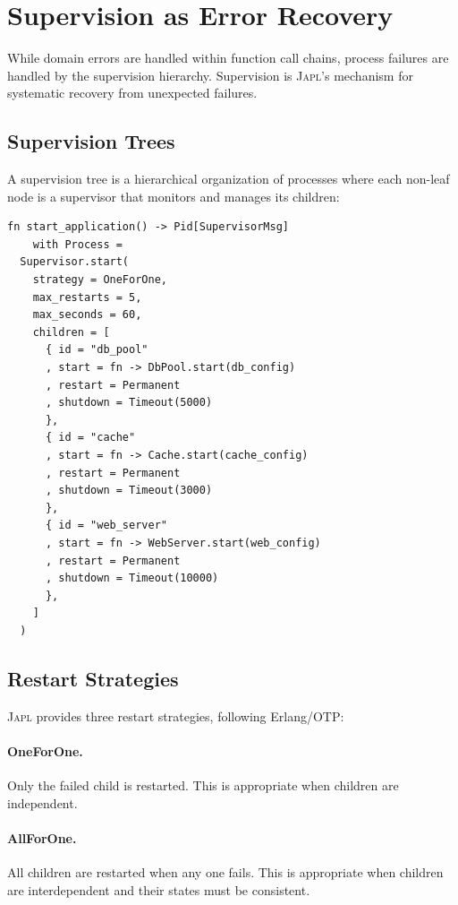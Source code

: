 \documentclass[11pt,twocolumn]{article}
\newcommand{\japl}{\textsc{Japl}}
\begin{document}
\section{Supervision as Error Recovery}\label{sec:supervision}

While domain errors are handled within function call chains, process failures are handled by the supervision hierarchy. Supervision is \japl{}'s mechanism for systematic recovery from unexpected failures.

\subsection{Supervision Trees}

A supervision tree is a hierarchical organization of processes where each non-leaf node is a supervisor that monitors and manages its children:

\begin{lstlisting}
fn start_application() -> Pid[SupervisorMsg]
    with Process =
  Supervisor.start(
    strategy = OneForOne,
    max_restarts = 5,
    max_seconds = 60,
    children = [
      { id = "db_pool"
      , start = fn -> DbPool.start(db_config)
      , restart = Permanent
      , shutdown = Timeout(5000)
      },
      { id = "cache"
      , start = fn -> Cache.start(cache_config)
      , restart = Permanent
      , shutdown = Timeout(3000)
      },
      { id = "web_server"
      , start = fn -> WebServer.start(web_config)
      , restart = Permanent
      , shutdown = Timeout(10000)
      },
    ]
  )
\end{lstlisting}

\subsection{Restart Strategies}

\japl{} provides three restart strategies, following Erlang/OTP:

\paragraph{OneForOne.} Only the failed child is restarted. This is appropriate when children are independent.

\paragraph{AllForOne.} All children are restarted when any one fails. This is appropriate when children are interdependent and their states must be consistent.
\end{document}
